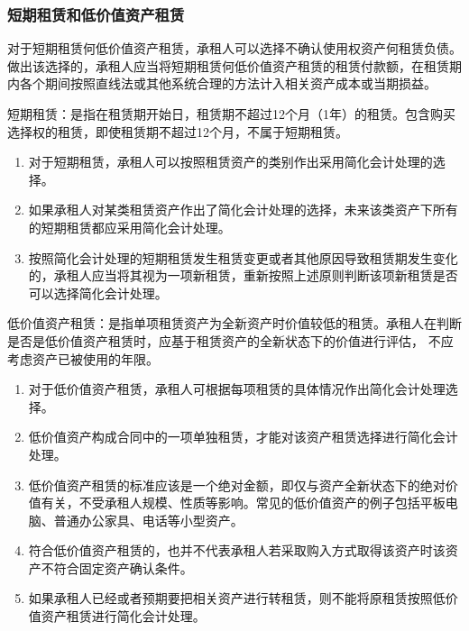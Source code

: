\documentclass[UTF8,12pt]{ctexart}
\numberwithin{equation}{section} %
\numberwithin{figure}{section}
\numberwithin{table}{section}
\begin{document}
	
	\subsubsection{短期租赁和低价值资产租赁}
	对于短期租赁何低价值资产租赁，承租人可以选择不确认使用权资产何租赁负债。做出该选择的，承租人应当将短期租赁何低价值资产租赁的租赁付款额，在租赁期内各个期间按照直线法或其他系统合理的方法计入相关资产成本或当期损益。
	
	短期租赁：是指在租赁期开始日，租赁期不超过12个月（1年）的租赁。包含购买选择权的租赁，即使租赁期不超过12个月，不属于短期租赁。
	\begin{enumerate}
		\item 对于短期租赁，承租人可以按照租赁资产的类别作出采用简化会计处理的选择。
		
		\item 如果承租人对某类租赁资产作出了简化会计处理的选择，未来该类资产下所有的短期租赁都应采用简化会计处理。
		
		\item 按照简化会计处理的短期租赁发生租赁变更或者其他原因导致租赁期发生变化的，承租人应当将其视为一项新租赁，重新按照上述原则判断该项新租赁是否可以选择简化会计处理。
		
	\end{enumerate}
	
	低价值资产租赁：是指单项租赁资产为全新资产时价值较低的租赁。承租人在判断是否是低价值资产租赁时，应基于租赁资产的全新状态下的价值进行评估， 不应考虑资产已被使用的年限。
	\begin{enumerate}
		\item 对于低价值资产租赁，承租人可根据每项租赁的具体情况作出简化会计处理选择。
		
		\item 低价值资产构成合同中的一项单独租赁，才能对该资产租赁选择进行简化会计处理。
		
		\item 低价值资产租赁的标准应该是一个绝对金额，即仅与资产全新状态下的绝对价值有关，不受承租人规模、性质等影响。常见的低价值资产的例子包括平板电脑、普通办公家具、电话等小型资产。
		
		\item 符合低价值资产租赁的，也并不代表承租人若采取购入方式取得该资产时该资产不符合固定资产确认条件。
		
		\item 如果承租人已经或者预期要把相关资产进行转租赁，则不能将原租赁按照低价值资产租赁进行简化会计处理。
		
	\end{enumerate}
\end{document}
